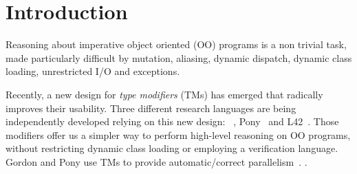 
\section{Introduction}
\saveSpace\saveSpace

Reasoning about imperative object oriented (OO) programs is a non trivial task,
made particularly difficult by mutation, aliasing, dynamic dispatch, dynamic class loading,
unrestricted I/O and exceptions.




Recently, a new design for \emph{type modifiers} (TMs) has emerged that radically improves their usability.
Three different research languages are being independently developed relying on this new design: ~\cite{?}, Pony~\cite{?} and L42~\cite{?}. Those modifiers offer us a simpler way to perform high-level reasoning on OO programs, without restricting dynamic class loading or employing a verification language.
Gordon and Pony use TMs to provide automatic/correct parallelism~\cite{GordonEtAl12,clebsch2015deny,clebsch2017orca}.
.

